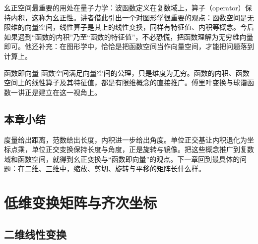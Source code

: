 \documentclass[a4paper]{article}
\begin{document}
幺正空间最重要的用处在量子力学：波函数定义在复数域上，算子（operator）保持内积，这称为幺正性。讲者借此引出一个对图形学很重要的观点：函数空间是无限维的向量空间，线性算子是其上的线性变换，同样有特征值、内积等概念。今后如果遇到“函数的内积”乃至“函数的特征值”，不必恐慌，把函数理解为无穷维向量即可。他还补充：在图形学中，恰恰是把函数空间当作向量空间，才能把问题落到计算上。

\begin{importantbox}{函数即向量}
函数空间满足向量空间的公理，只是维度为无穷。函数的内积、函数空间上的线性算子及其特征值，都是有限维概念的直接推广。傅里叶变换与球谐函数一讲正是建立在这一视角上。
\end{importantbox}

\subsection{本章小结}

度量给出距离，范数给出长度，内积进一步给出角度。单位正交基让内积退化为坐标点乘，单位正交变换保持长度与角度，正是旋转与镜像。把这些概念推广到复数域和函数空间，就得到幺正变换与“函数即向量”的观点。下一章回到最具体的问题：在二维、三维中，缩放、剪切、旋转与平移的矩阵长什么样。

\section{低维变换矩阵与齐次坐标}

\subsection{二维线性变换}
\end{document}

